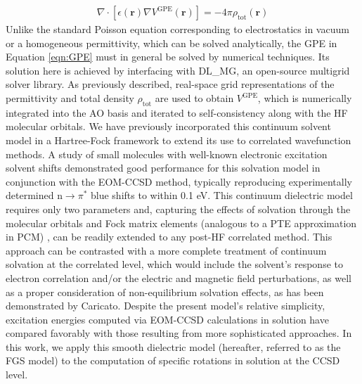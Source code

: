 \begin{align}
\nabla \cdot  \left[ \epsilon({\mathbf{r}})\nabla V^\mathrm{GPE}({\mathbf{r}})\right] = 
-4\pi \rho_\mathrm{tot}({\mathbf{r}})
\label{eqn:GPE}
\end{align}
Unlike the standard Poisson equation corresponding to electrostatics in vacuum
or a homogeneous permittivity, which can be solved analytically,
the GPE in Equation \ref{eqn:GPE} must in general be solved by numerical
techniques. Its solution here is achieved by interfacing with 
DL\_MG,\cite{Womack:18} an open-source multigrid solver library. As previously
described,\cite{Howard:17} real-space grid representations of the permittivity
and total density $\rho_\mathrm{tot}$ are used to obtain $V^\mathrm{GPE}$,
which is numerically integrated into the AO basis and iterated to self-consistency
along with the HF molecular orbitals.
We have previously\cite{Howard:17} incorporated this continuum
solvent model in a Hartree-Fock framework to extend its use to
correlated wavefunction methods.
A study of small molecules with well-known electronic excitation
solvent shifts demonstrated good performance for this solvation model
in conjunction with the EOM-CCSD method, typically reproducing experimentally
determined n$\rightarrow \pi^*$ blue shifts to within 0.1 eV.\cite{Howard:17}
This continuum dielectric model requires only two parameters and,
capturing the effects of solvation through the molecular orbitals
and Fock matrix elements (analogous to a PTE approximation in PCM)
\cite{Lipparini:16,Cammi:13},
can be readily extended to any post-HF
correlated method.  This approach can be contrasted with a more complete
treatment of continuum solvation at the correlated level, which
would include the solvent's response to electron correlation and/or the
electric and magnetic field perturbations, as well as a proper
consideration of non-equilibrium solvation effects, as has been demonstrated
by Caricato.\cite{Caricato:13} Despite the present model's relative simplicity,
excitation energies computed via EOM-CCSD calculations in solution have
compared favorably with those resulting from more sophisticated approaches.
\cite{Howard:17} In this work, we apply this smooth dielectric model
(hereafter, referred to as the FGS model)
to the computation of specific rotations in solution at the CCSD level.


